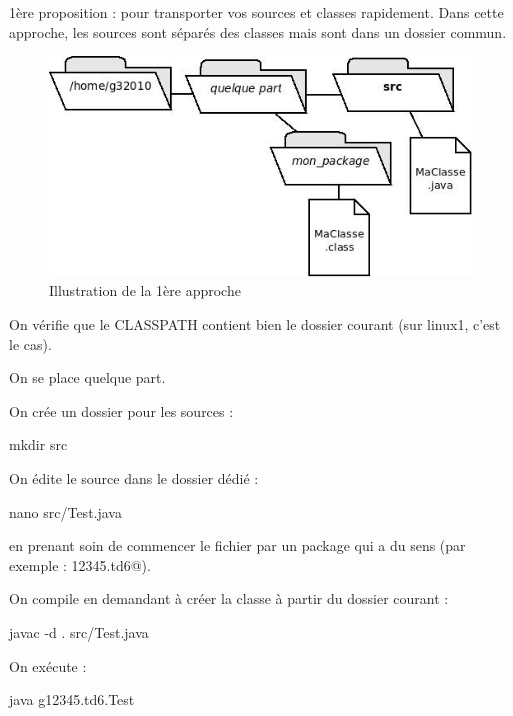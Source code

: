 \documentclass[a4paper,11pt]{article}
\begin{document}
			
			\begin{Tutoriel}{1\`ere proposition : pour transporter vos sources et classes rapidement.} 
				Dans cette approche, les sources sont s\'epar\'es des classes mais sont dans un dossier commun.
			
            		\par
       			 	\begin{figure}[hbt]
				    	\begin{center}
						\includegraphics[width=0.6\linewidth,height=0.8\textheight,keepaspectratio=true]{image/approche4.jpeg}
					\end{center}
                
                   			 \caption[Illustration de la 1\`ere approche]{Illustration de la 1\`ere approche}
               			 \end{figure}
                    
				\begin{steps}
				
					\item On v\'erifie que le CLASSPATH contient bien le 
						dossier courant (sur linux1, c'est le cas).
				
					\item On se place quelque part.
				
					\item On cr\'ee un dossier pour les sources : 
						\begin{Console}
							mkdir src
						\end{Console}
					\item On \'edite le source dans le dossier d\'edi\'e : 
						\begin{Console}
							nano src/Test.java
						\end{Console}
				
						en prenant soin de commencer le fichier par un package qui a du sens
						(par exemple : \verb@g12345.td6@).
				
					\item On compile en demandant \`a cr\'eer la classe \`a partir
						du dossier courant : 
						\begin{Console}
							javac -d . src/Test.java
						\end{Console}
					\item On ex\'ecute : 
						\begin{Console}
							java g12345.td6.Test
						\end{Console}
				\end{steps}
				
			\end{Tutoriel}	
\end{document}
